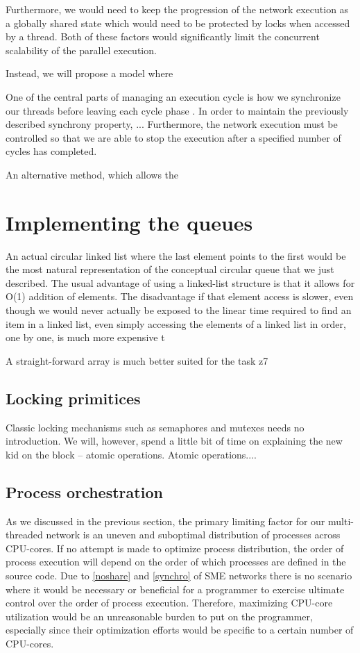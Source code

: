 Furthermore, we would need to keep the progression of the network
execution as a globally shared state which would need to be protected
by locks when accessed by a thread. Both of these factors would
significantly limit the concurrent scalability of the parallel
execution.

Instead, we will propose a model where 

One of the central parts of managing an execution cycle is how we
synchronize our threads before leaving each cycle phase
. In order to maintain the previously described
synchrony property, ... Furthermore, the network execution must be
controlled so that we are able to stop the execution after a specified
number of cycles has completed.


An alternative method, which allows the 

\section{Implementing the queues}
An actual circular linked list where the last element points to the
first would be the most natural representation of the conceptual
circular queue that we just described. The usual advantage of using a
linked-list structure is that it allows for O(1) addition of
elements. The disadvantage if that element access is slower, even
though we would never actually be exposed to the linear time required
to find an item in a linked list, even simply accessing the elements
of a linked list in order, one by one, is much more expensive t


A straight-forward array is much better suited for the task z7

\subsection{Locking primitices}
Classic locking mechanisms such as semaphores and mutexes needs no
introduction. We will, however, spend a little bit of time on
explaining the new kid on the block -- atomic operations.  Atomic
operations....

\subsection{Process orchestration}
As we discussed in the previous section, the primary limiting factor
for our multi-threaded network is an uneven and suboptimal
distribution of processes across CPU-cores. If no attempt is made to
optimize process distribution, the order of process execution will
depend on the order of which processes are defined in the source
code. Due to \cref{noshare} and \cref{synchro} of SME
networks there is no scenario where it would be necessary or
beneficial for a programmer to exercise ultimate control over the
order of process execution. Therefore, maximizing CPU-core utilization
would be an unreasonable burden to put on the programmer, especially
since their optimization efforts would be specific to a certain number
of CPU-cores.

